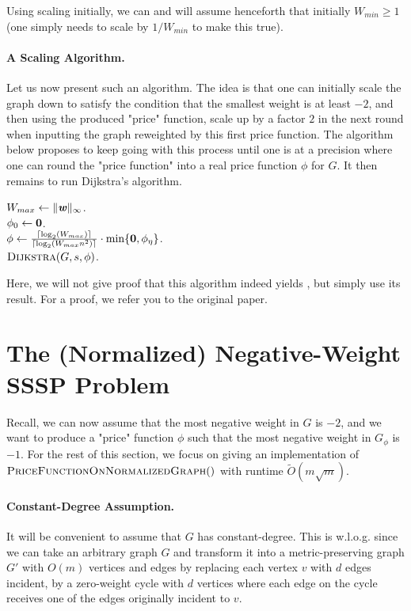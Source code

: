 Using scaling initially, we can and will assume henceforth that initially $W_{min} \geq 1$ (one simply needs to scale by $1/W_{min}$ to make this true).

\paragraph{A Scaling Algorithm.} Let us now present such an algorithm. The idea is that one can initially scale the graph down to satisfy the condition that the smallest weight is at least $-2$, and then using the produced "price" function, scale up by a factor $2$ in the next round when inputting the graph reweighted by this first price function. The algorithm below proposes to keep going with this process until one is at a precision where one can round the "price function" into a real price function $\phi$ for $G$. It then remains to run Dijkstra's algorithm.

\begin{algorithm}
$W_{max} \gets \|\boldsymbol{\mathit{w}}\|_{\infty}$.\\
$\phi_0 \gets \boldsymbol{0}$.\\
$\phi \gets \frac{\lceil \log_2(W_{max})\rceil}{\lceil \log_2(W_{max} n^2)\rceil} \cdot \min\{ \boldsymbol{0}, \phi_\eta \}$.\\
\Return $\textsc{Dijkstra}(G, s, \phi)$.
\caption{$\textsc{NegativeSSSP}(G,s)$}
\end{algorithm}

Here, we will not give proof that this algorithm indeed yields , but simply use its result. For a proof, we refer you to the original paper.

\section{The (Normalized) Negative-Weight SSSP Problem}

Recall, we can now assume that the most negative weight in $G$ is $-2$, and we want to produce a "price" function $\phi$ such that the most negative weight in $G_{\phi}$ is $-1$. For the rest of this section, we focus on giving an implementation of $\textsc{PriceFunctionOnNormalizedGraph}()$ with runtime $\tilde{O}(m\sqrt{m})$.

\paragraph{Constant-Degree Assumption.} It will be convenient to assume that $G$ has constant-degree. This is w.l.o.g. since we can take an arbitrary graph $G$ and transform it into a metric-preserving graph $G'$ with $O(m)$ vertices and edges by replacing each vertex $v$ with $d$ edges incident, by a zero-weight cycle with $d$ vertices where each edge on the cycle receives one of the edges originally incident to $v$.

